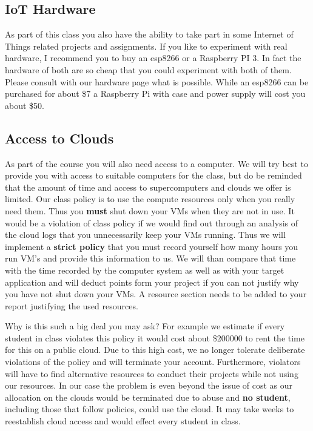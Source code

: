 \subsection{IoT Hardware}

As part of this class you also have the ability to take part in some
Internet of Things related projects and assignments. If you like to
experiment with real hardware, I recommend you to buy an esp8266 or a
Raspberry PI 3. In fact the hardware of both are so cheap that you could
experiment with both of them. Please consult with our hardware page what
is possible. While an esp8266 can be purchased for about \$7 a Raspberry
Pi with case and power supply will cost you about \$50.

\subsection{Access to Clouds}

As part of the course you will also need access to a computer. We will
try best to provide you with access to suitable computers for the class,
but do be reminded that the amount of time and access to supercomputers
and clouds we offer is limited. Our class policy is to use the compute
resources only when you really need them. Thus you \textbf{must} shut
down your VMs when they are not in use. It would be a violation of class
policy if we would find out through an analysis of the cloud logs that
you unnecessarily keep your VMs running. Thus we will implement a
\textbf{strict policy} that you must record yourself how many hours you
run VM's and provide this information to us. We will than compare that
time with the time recorded by the computer system as well as with your
target application and will deduct points form your project if you can
not justify why you have not shut down your VMs. A resource section
needs to be added to your report justifying the used resources.

Why is this such a big deal you may ask? For example we estimate if
every student in class violates this policy it would cost about \$200000
to rent the time for this on a public cloud. Due to this high cost, we
no longer tolerate deliberate violations of the policy and will
terminate your account. Furthermore, violators will have to find
alternative resources to conduct their projects while not using our
resources. In our case the problem is even beyond the issue of cost as
our allocation on the clouds would be terminated due to abuse and
\textbf{no student}, including those that follow policies, could use the
cloud. It may take weeks to reestablish cloud access and would effect
every student in class.


